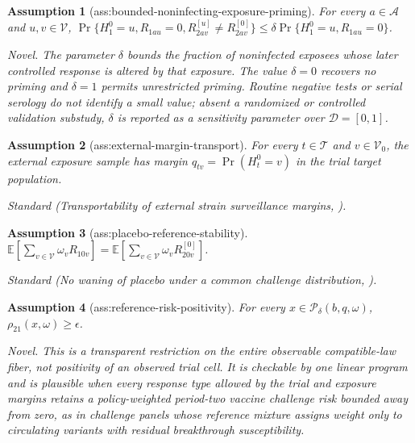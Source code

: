 \documentclass{article}
\newtheorem{assumption}{Assumption}
\begin{document}
\begin{assumption}[ass:bounded-noninfecting-exposure-priming]\label{ass:bounded-noninfecting-exposure-priming}
For every \(a\in\mathcal A\) and \(u,v\in\mathcal V\), \(\Pr\{H_1^0=u,R_{1au}=0,R^{[u]}_{2av}\neq R^{[0]}_{2av}\}\leq\delta\Pr\{H_1^0=u,R_{1au}=0\}\).
\par\smallskip\noindent\emph{Novel.} The parameter \(\delta\) bounds the fraction of noninfected exposees whose later controlled response is altered by that exposure. The value \(\delta=0\) recovers no priming and \(\delta=1\) permits unrestricted priming. Routine negative tests or serial serology do not identify a small value; absent a randomized or controlled validation substudy, \(\delta\) is reported as a sensitivity parameter over \(\mathcal D=[0,1]\).
\end{assumption}

\begin{assumption}[ass:external-margin-transport]\label{ass:external-margin-transport}
For every \(t\in\mathcal T\) and \(v\in\mathcal V_0\), the external exposure sample has margin \(q_{tv}=\Pr(H_t^0=v)\) in the trial target population.
\par\smallskip\noindent\emph{Standard} (Transportability of external strain surveillance margins, \cite{follmann_fay_magaret_gilbert_2022_surveillance}).
\end{assumption}

\begin{assumption}[ass:placebo-reference-stability]\label{ass:placebo-reference-stability}
\(\mathbb E[\sum_{v\in\mathcal V}\omega_vR_{10v}]=\mathbb E[\sum_{v\in\mathcal V}\omega_vR^{[0]}_{20v}]\).
\par\smallskip\noindent\emph{Standard} (No waning of placebo under a common challenge distribution, \cite{janvin_stensrud_2025_challenge}).
\end{assumption}

\begin{assumption}[ass:reference-risk-positivity]\label{ass:reference-risk-positivity}
For every \(x\in\mathcal P_\delta(b,q,\omega)\), \(\rho_{21}(x,\omega)\geq\epsilon\).
\par\smallskip\noindent\emph{Novel.} This is a transparent restriction on the entire observable compatible-law fiber, not positivity of an observed trial cell. It is checkable by one linear program and is plausible when every response type allowed by the trial and exposure margins retains a policy-weighted period-two vaccine challenge risk bounded away from zero, as in challenge panels whose reference mixture assigns weight only to circulating variants with residual breakthrough susceptibility.
\end{assumption}
\end{document}
